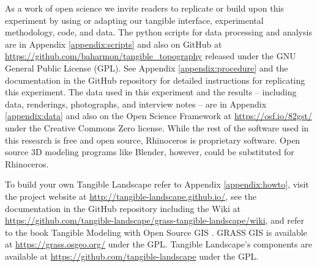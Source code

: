 \documentclass[prodmode,acmtochi]{acmsmall} %
\begin{document}
As a work of open science we invite readers to
replicate or build upon this experiment by 
using or adapting our tangible interface, experimental methodology, code, and data. 
The python scripts for data processing and analysis
are in Appendix \ref{appendix:scripts} and also
on GitHub at \url{https://github.com/baharmon/tangible_topography}
released under the GNU General Public License (GPL).
See Appendix \ref{appendix:procedure}
and the documentation in the GitHub repository 
for detailed instructions for replicating this experiment. 
The data used in this experiment 
and the results -- 
including data, renderings, photographs, and interview notes --
are in Appendix \ref{appendix:data}
and also on the Open Science Framework 
at \url{https://osf.io/82gst/} under the Creative Commons Zero license.
While the rest of the software used in this research is free and open source, 
Rhinoceros is proprietary software. 
Open source 3D modeling programs like Blender, however,
could be substituted for Rhinoceros. 

To build your own Tangible Landscape
refer to Appendix \ref{appendix:howto},
visit the project website at \url{http://tangible-landscape.github.io/}, 
see the documentation in the GitHub repository 
including the Wiki at \url{https://github.com/tangible-landscape/grass-tangible-landscape/wiki},
and refer to the book Tangible Modeling with Open Source GIS \cite{Petrasova2015}.
GRASS GIS is available at
\url{https://grass.osgeo.org/} 
under the GPL. 
Tangible Landscape's components are available at
\url{https://github.com/tangible-landscape}
under the GPL. 
\end{document}
